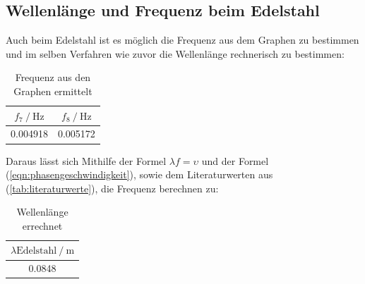    \subsection{Wellenlänge und Frequenz beim Edelstahl}
    Auch beim Edelstahl ist es möglich die Frequenz aus dem Graphen zu bestimmen und im selben Verfahren wie zuvor die Wellenlänge rechnerisch zu bestimmen:
\begin{table}
        \centering
            \begin{tabular}{c c}
            \toprule
            {$ f_7 \mathbin{/} \si{\hertz} $}
            & {$ f_8 \mathbin{/} \si{\hertz} $} \\
            \midrule
            0.004918 & 0.005172 \\
            \bottomrule
            \end{tabular}
        \caption{Frequenz aus den Graphen ermittelt}
        \label{tab:MesWellen}
    \end{table}

    Daraus lässt sich Mithilfe der Formel $\lambda f = \upsilon$ und der Formel (\ref{eqn:phasengeschwindigkeit}), sowie dem Literaturwerten aus (\ref{tab:literaturwerte}), die Frequenz berechnen zu:
\begin{table}
        \centering
            \begin{tabular}{c}
            \toprule
            {$   \lambda\text{Edelstahl} \mathbin{/} \si{\meter} $} \\
            \midrule
            0.0848 \\
            \bottomrule
            \end{tabular}
        \caption{Wellenlänge errechnet}
        \label{tab:MesWellene}
    \end{table}